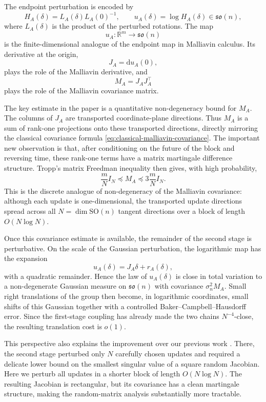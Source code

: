 \documentclass[11pt, reqno]{amsart}
\numberwithin{equation}{section}
\theoremstyle{remark}
\newcommand{\R}{\mathbb{R}}
\newcommand{\1}{\mathbf{1}}
\newcommand{\SO}{\mathrm{SO}}
\newcommand{\so}{\mathfrak{so}}
\newcommand{\dd}{\mathrm{d}}
\begin{document}
The endpoint perturbation is encoded by
\[
    H_A(\delta)=L_A(\delta)L_A(0)^{-1},
    \qquad
    u_A(\delta)=\log H_A(\delta)\in\so(n),
\]
where \(L_A(\delta)\) is the product of the perturbed rotations.  The map
\[
    u_A:\R^m\to\so(n)
\]
is the finite-dimensional analogue of the endpoint map in Malliavin calculus.
Its derivative at the origin,
\[
    J_A=\dd u_A(0),
\]
plays the role of the Malliavin derivative, and
\[
    M_A=J_AJ_A^\top
\]
plays the role of the Malliavin covariance matrix.

The key estimate in the paper is a quantitative non-degeneracy bound for \(M_A\).
The columns of \(J_A\) are transported coordinate-plane directions.  Thus \(M_A\)
is a sum of rank-one projections onto these transported directions, directly
mirroring the classical covariance formula
\eqref{eq:classical-malliavin-covariance}.  The important new observation is that,
after conditioning on the future of the block and reversing time, these rank-one
terms have a matrix martingale difference structure.  Tropp's matrix Freedman
inequality then gives, with high probability,
\[
    \frac{m}{N}I_N
    \preceq
    M_A
    \preceq
    3\frac{m}{N}I_N.
\]
This is the discrete analogue of non-degeneracy of the Malliavin covariance:
although each update is one-dimensional, the transported update directions spread
across all \(N=\dim\SO(n)\) tangent directions over a block of length
\(O(N\log N)\).

Once this covariance estimate is available, the remainder of the second stage is
perturbative.  On the scale of the Gaussian perturbation, the logarithmic map has
the expansion
\[
    u_A(\delta)=J_A\delta+r_A(\delta),
\]
with a quadratic remainder.  Hence the law of \(u_A(\delta)\) is close in total
variation to a non-degenerate Gaussian measure on \(\so(n)\) with covariance
\(\sigma_n^2M_A\).  Small right translations of the group then become, in
logarithmic coordinates, small shifts of this Gaussian together with a controlled
Baker--Campbell--Hausdorff error.  Since the first-stage coupling has already
made the two chains \(N^{-4}\)-close, the resulting translation cost is \(o(1)\).

This perspective also explains the improvement over our previous work
\cite{PillaiSmith}.  There, the second stage perturbed only \(N\) carefully
chosen updates and required a delicate lower bound on the smallest singular value
of a square random Jacobian.  Here we perturb all updates in a shorter block of
length \(O(N\log N)\).  The resulting Jacobian is rectangular, but its covariance
has a clean martingale structure, making the random-matrix analysis substantially
more tractable.
\end{document}
